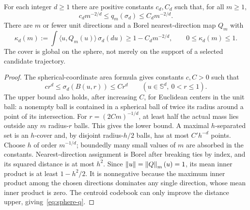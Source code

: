 \begin{lemma}\label{lem:sphere-geometry}
For each integer $d\ge1$ there are positive constants $c_d,C_d$ such that, for all $m\ge1$,
\begin{equation}\label{eq:sphere-q}
 c_dm^{-2/d}\le q_m(\sigma_d)\le C_dm^{-2/d}.
\end{equation}
There are $m$ or fewer unit directions and a Borel nearest-direction map $Q_m$ with
\[
 \kappa_d(m):=\int\langle u,Q_m(u)\rangle\,\sigma_d(du)
 \ge 1-C_dm^{-2/d},\qquad 0\le\kappa_d(m)\le1.
\]
The cover is global on the sphere, not merely on the support of a selected candidate trajectory.
\end{lemma}
\begin{proof}
The spherical-coordinate area formula gives constants $c,C>0$ such that
\[c r^d\le\sigma_d(B(u,r))\le C r^d\qquad(u\in\mathbb S^d,\ 0<r\le1).\] The upper bound also holds, after increasing $C$, for Euclidean centers in the unit ball: a nonempty ball is contained in a spherical ball of twice its radius around a point of its intersection. For $r=(2Cm)^{-1/d}$, at least half the actual mass lies outside any $m$ radius-$r$ balls. This gives the lower bound. A maximal $h$-separated set is an $h$-cover and, by disjoint radius-$h/2$ balls, has at most $C'h^{-d}$ points. Choose $h$ of order $m^{-1/d}$; boundedly many small values of $m$ are absorbed in the constants. Nearest-direction assignment is Borel after breaking ties by index, and its squared distance is at most $h^2$. Since $\left\lVert u\right\rVert=\left\lVert Q\right\rVert_m(u)=1$, its mean inner product is at least $1-h^2/2$. It is nonnegative because the maximum inner product among the chosen directions dominates any single direction, whose mean inner product is zero. The centroid codebook can only improve the distance upper, giving~\eqref{eq:sphere-q}.
\end{proof}

